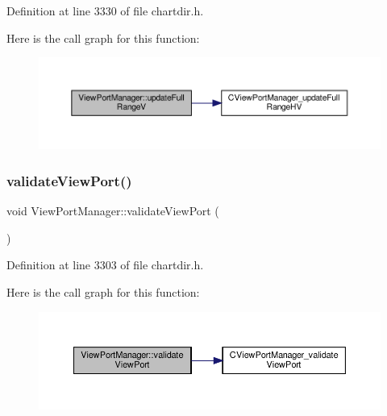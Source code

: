 Definition at line 3330 of file chartdir.\+h.

Here is the call graph for this function\+:
\nopagebreak
\begin{figure}[H]
\begin{center}
\leavevmode
\includegraphics[width=350pt]{class_view_port_manager_ac54ae9b215ca55fc30cfe5cbacfe0865_cgraph}
\end{center}
\end{figure}
\mbox{\label{class_view_port_manager_a5b6604b59e8c04fe2e32b67f12c4c002}} 
\subsubsection{\texorpdfstring{validate\+View\+Port()}{validateViewPort()}}
{\footnotesize\ttfamily void View\+Port\+Manager\+::validate\+View\+Port (\begin{DoxyParamCaption}{ }\end{DoxyParamCaption})\hspace{0.3cm}{\ttfamily [inline]}}



Definition at line 3303 of file chartdir.\+h.

Here is the call graph for this function\+:
\nopagebreak
\begin{figure}[H]
\begin{center}
\leavevmode
\includegraphics[width=350pt]{class_view_port_manager_a5b6604b59e8c04fe2e32b67f12c4c002_cgraph}
\end{center}
\end{figure}
\mbox{\label{class_view_port_manager_ae1be85f3a163f841202bdc260d04f8f3}} 
